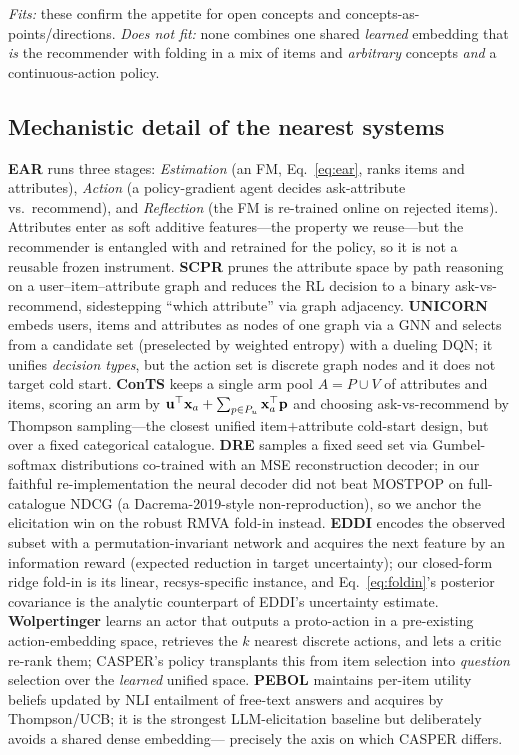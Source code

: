 \emph{Fits:} these confirm the appetite for open concepts and concepts-as-points/directions. \emph{Does not fit:}
none combines one shared \emph{learned} embedding that \emph{is} the recommender with folding in a mix of items
and \emph{arbitrary} concepts \emph{and} a continuous-action policy.

\subsection{Mechanistic detail of the nearest systems}
\textbf{EAR} runs three stages: \emph{Estimation} (an FM, Eq.~\eqref{eq:ear}, ranks items and attributes),
\emph{Action} (a policy-gradient agent decides ask-attribute vs.\ recommend), and \emph{Reflection} (the FM is
re-trained online on rejected items). Attributes enter as soft additive features---the property we reuse---but the
recommender is entangled with and retrained for the policy, so it is not a reusable frozen instrument.
\textbf{SCPR} prunes the attribute space by path reasoning on a user--item--attribute graph and reduces the RL
decision to a binary ask-vs-recommend, sidestepping ``which attribute'' via graph adjacency. \textbf{UNICORN}
embeds users, items and attributes as nodes of one graph via a GNN and selects from a candidate set (preselected by
weighted entropy) with a dueling DQN; it unifies \emph{decision types}, but the action set is discrete graph nodes
and it does not target cold start. \textbf{ConTS} keeps a single arm pool $A=P\cup V$ of attributes and items,
scoring an arm by $\mathbf{u}^\top\mathbf x_a+\sum_{p\in P_u}\mathbf x_a^\top\mathbf p$ and choosing ask-vs-recommend by
Thompson sampling---the closest unified item$+$attribute cold-start design, but over a fixed categorical
catalogue. \textbf{DRE} samples a fixed seed set via Gumbel-softmax distributions co-trained with an MSE
reconstruction decoder; in our faithful re-implementation the neural decoder did not beat MOSTPOP on
full-catalogue NDCG (a Dacrema-2019-style non-reproduction), so we anchor the elicitation win on the robust RMVA
fold-in instead. \textbf{EDDI} encodes the observed subset with a permutation-invariant network and acquires the
next feature by an information reward (expected reduction in target uncertainty); our closed-form ridge fold-in is
its linear, recsys-specific instance, and Eq.~\eqref{eq:foldin}'s posterior covariance is the analytic counterpart
of EDDI's uncertainty estimate. \textbf{Wolpertinger} learns an actor that outputs a proto-action in a pre-existing
action-embedding space, retrieves the $k$ nearest discrete actions, and lets a critic re-rank them; CASPER's policy
transplants this from item selection into \emph{question} selection over the \emph{learned} unified space.
\textbf{PEBOL} maintains per-item utility beliefs updated by NLI entailment of free-text answers and acquires by
Thompson/UCB; it is the strongest LLM-elicitation baseline but deliberately avoids a shared dense embedding---
precisely the axis on which CASPER differs.

